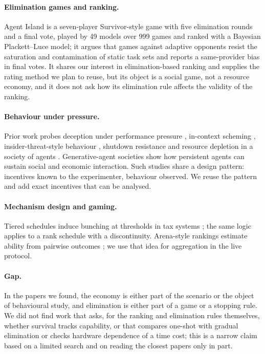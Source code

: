\documentclass[11pt]{article}
\theoremstyle{plain}
\theoremstyle{remark}
\begin{document}
\paragraph{Elimination games and ranking.}
Agent Island \citep{murphy2026agentisland} is a seven-player Survivor-style game with five elimination rounds and a final vote, played by 49 models over 999 games and ranked with a Bayesian Plackett--Luce model; it argues that games against adaptive opponents resist the saturation and contamination of static task sets and reports a same-provider bias in final votes. It shares our interest in elimination-based ranking and supplies the rating method we plan to reuse, but its object is a social game, not a resource economy, and it does not ask how its elimination rule affects the validity of the ranking.

\paragraph{Behaviour under pressure.}
Prior work probes deception under performance pressure \citep{scheurer2023large}, in-context scheming \citep{meinke2024frontier}, insider-threat-style behaviour \citep{lynch2025agentic}, shutdown resistance \citep{schlatter2025incomplete} and resource depletion in a society of agents \citep{piatti2024cooperate}. Generative-agent societies \citep{park2023generative} show how persistent agents can sustain social and economic interaction. Such studies share a design pattern: incentives known to the experimenter, behaviour observed. We reuse the pattern and add exact incentives that can be analysed.

\paragraph{Mechanism design and gaming.}
Tiered schedules induce bunching at thresholds in tax systems \citep{saez2010taxpayers,kleven2016bunching}; the same logic applies to a rank schedule with a discontinuity. Arena-style rankings estimate ability from pairwise outcomes \citep{chiang2024chatbot}; we use that idea for aggregation in the live protocol.

\paragraph{Gap.}
In the papers we found, the economy is either part of the scenario or the object of behavioural study, and elimination is either part of a game or a stopping rule. We did not find work that asks, for the ranking and elimination rules themselves, whether survival tracks capability, or that compares one-shot with gradual elimination or checks hardware dependence of a time cost; this is a narrow claim based on a limited search and on reading the closest papers only in part.
\end{document}
